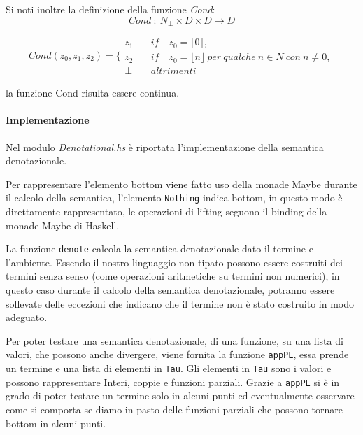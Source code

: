 \documentclass{article}
\begin{document}
Si noti inoltre la definizione della funzione \emph{Cond}:
$$
Cond\ :\ N_{\perp} \times D \times D \rightarrow D
$$

\begin{equation*}
\left.
Cond (z_{0},z_{1},z_{2}) =
\right.\Bigg\{
\begin{aligned}
z_{1} \quad & if \quad z_{0} = \lfloor 0 \rfloor,
\\
z_{2} \quad & if \quad z_{0} = \lfloor n \rfloor \ per \ qualche\ n\in N \ con\ n \neq 0,
\\
\perp \quad & altrimenti 
\end{aligned}
\end{equation*}

la funzione Cond risulta essere continua.

\paragraph{Implementazione}
Nel modulo \emph{Denotational.hs} è riportata l'implementazione della semantica denotazionale.

Per rappresentare l'elemento bottom viene fatto uso della monade Maybe durante il calcolo della semantica, l'elemento \texttt{Nothing} indica bottom, in questo modo è direttamente rappresentato, le operazioni di lifting seguono il binding della monade Maybe di Haskell.

La funzione \texttt{denote} calcola la semantica denotazionale dato il termine e l'ambiente. Essendo il nostro linguaggio non tipato possono essere costruiti dei termini senza senso (come operazioni aritmetiche su termini non numerici), in questo caso durante il calcolo della semantica denotazionale, potranno essere sollevate delle eccezioni che indicano che il termine non è stato costruito in modo adeguato.

Per poter testare una semantica denotazionale, di una funzione, su una lista di valori, che possono anche divergere, viene fornita la funzione \texttt{appPL}, essa prende un termine e una lista di elementi in \texttt{Tau}. Gli elementi in \texttt{Tau} sono i valori e possono rappresentare Interi, coppie e funzioni parziali.
Grazie a \texttt{appPL} si è in grado di poter testare un termine solo in alcuni punti ed eventualmente osservare come si comporta se diamo in pasto delle funzioni parziali che possono tornare bottom in alcuni punti.

\end{document}
